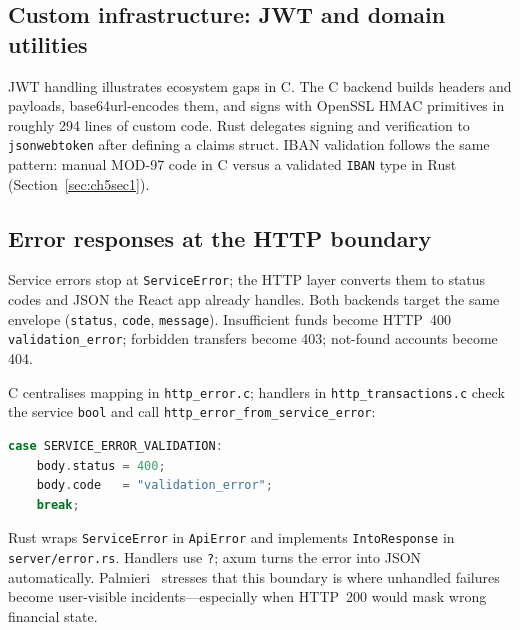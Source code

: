 \subsection{Custom infrastructure: JWT and domain utilities}
\label{subsec:ch6sec2-3}

\par JWT handling illustrates ecosystem gaps in C. The C backend builds headers and payloads, base64url-encodes them, and signs with OpenSSL HMAC primitives in roughly 294 lines of custom code. Rust delegates signing and verification to \texttt{jsonwebtoken} after defining a claims struct. IBAN validation follows the same pattern: manual MOD-97 code in C versus a validated \texttt{IBAN} type in Rust (Section~\ref{sec:ch5sec1}).

\subsection{Error responses at the HTTP boundary}
\label{subsec:ch6sec2-5}

\par Service errors stop at \texttt{ServiceError}; the HTTP layer converts them to status 
codes and JSON the React app already handles. Both backends target the same envelope 
(\texttt{status}, \texttt{code}, \texttt{message}). Insufficient funds become HTTP~400 
\texttt{validation\_error}; forbidden transfers become 403; not-found accounts become 404.

\par C centralises mapping in \texttt{http\_error.c}; handlers in \texttt{http\_transactions.c} 
check the service \texttt{bool} and call \texttt{http\_error\_from\_service\_error}:

\begin{lstlisting}[language=C, caption={http\_error.c --- HTTP mapping lives only here,
not in the service layer (Section~\ref{sec:ch5sec2}).}]
case SERVICE_ERROR_VALIDATION:
    body.status = 400;
    body.code   = "validation_error";
    break;
\end{lstlisting}

\par Rust wraps \texttt{ServiceError} in \texttt{ApiError} and implements 
\texttt{IntoResponse} in \texttt{server/error.rs}. Handlers use \texttt{?}; axum turns 
the error into JSON automatically. Palmieri~\cite{Palmieri2022} stresses that this 
boundary is where unhandled failures become user-visible incidents---especially when 
HTTP~200 would mask wrong financial state.

